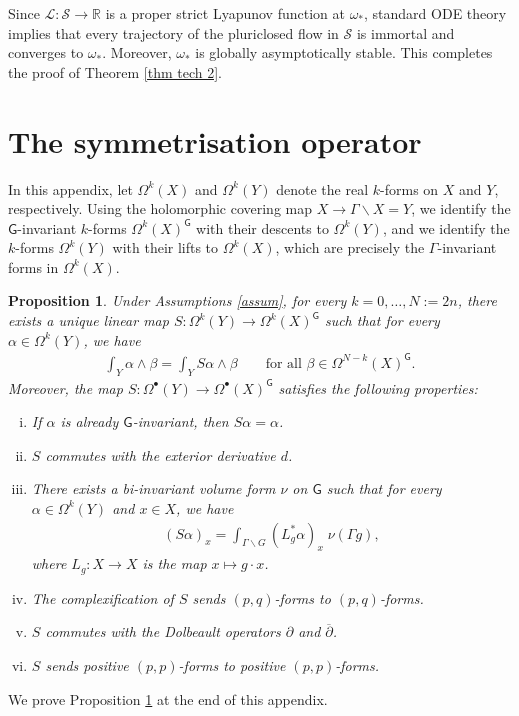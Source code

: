 \documentclass[11pt,reqno]{amsart}
\newcommand{\R}{\mathbb R}
\newcommand{\G}{\mathsf {G}}
\renewcommand{\S}{\mathcal S}
\renewcommand{\L}{\mathcal L}
\theoremstyle{plain}
\newtheorem{proposition}[theorem]{Proposition}
\theoremstyle{definition}
\theoremstyle{remark}
\begin{document}
Since $\L:\S \rightarrow \R$ is a proper strict Lyapunov function at $\omega_*$, standard ODE theory implies that  every trajectory of the pluriclosed flow in $\S$ is immortal and converges to $\omega_*$. Moreover, $\omega_*$ is globally asymptotically stable. This completes the proof of Theorem \ref{thm tech 2}.


\appendix
\section{The symmetrisation operator}
\label{sec A}
In this appendix, let $\Omega^k(X)$ and $\Omega^k(Y)$ denote the real $k$-forms on $X$ and $Y$, respectively.
Using the holomorphic covering map $X \rightarrow \Gamma \backslash X = Y$, we identify the $\G$-invariant $k$-forms $\Omega^k(X)^\G$ with their descents to $\Omega^k(Y)$, and we identify the $k$-forms $\Omega^k(Y)$ with their lifts to $\Omega^k(X)$, which are precisely the $\Gamma$-invariant forms in  $\Omega^k(X)$.

\begin{proposition}
    \label{prop sym operator}
    Under Assumptions \ref{assum}, for every $k = 0,\ldots, N := 2n$, there exists a unique linear map $S: \Omega^k(Y) \rightarrow \Omega^k(X)^\G$ such that for every $\alpha \in \Omega^k(Y)$, we have
    \begin{align}
        \label{def S}
        \int_Y \alpha \wedge \beta = \int_Y S \alpha \wedge \beta \qquad \text{for all $\beta \in \Omega^{N-k}(X)^\G$}.
    \end{align}
    Moreover, the map $S: \Omega^{\bullet}(Y) \rightarrow \Omega^{\bullet}(X)^\G$ satisfies the following properties:
    \begin{enumerate}[(i)]
        \item \label{sym0} If $\alpha$ is already $\G$-invariant, then $S \alpha = \alpha$.
        \item \label{sym1}$S$ commutes with the exterior derivative $d$.
        \item \label{sym2}There exists a bi-invariant volume form $\nu$ on $\G$ such that for every $\alpha \in \Omega^k(Y)$ and $x \in X$, we have 
        \begin{align}
            \label{sym integral}
            (S\alpha)_x = \int_{\Gamma \backslash G} (L_g^* \alpha)_x\;  \nu(\Gamma g),
        \end{align}
        where $L_g:X \rightarrow X$ is the map $x \mapsto g \cdot x$.
        \item \label{sym3}The complexification of $S$ sends $(p,q)$-forms to $(p,q)$-forms.
        \item \label{sym4}$S$ commutes with the Dolbeault operators $\partial$ and $\overline \partial$.
        \item \label{sym5}$S$ sends positive $(p,p)$-forms to positive $(p,p)$-forms.
    \end{enumerate}
\end{proposition}
We prove Proposition \ref{prop sym operator} at the end of this appendix. 
\end{document}

